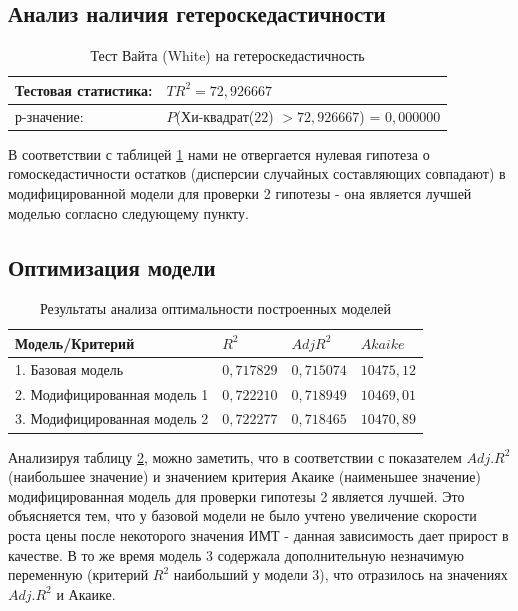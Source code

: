 \documentclass[a4paper,12pt]{article}
\begin{document}
\subsection{Анализ наличия гетероскедастичности}
\begin{table}[H]
	\begin{center}
		\begin{tabular}{ | l | l |}
			\hline
			Тестовая статистика: & $TR^2 = 72,926667$ \\ \hline
			р-значение: & $P$(Хи-квадрат($22$) $> 72,926667$) = $0,000000$ \\ \hline
		\end{tabular}
	\end{center}
	\caption{Тест Вайта (White) на гетероскедастичность}
	\label{tab:white}
\end{table}

В соответствии с таблицей \ref{tab:white} нами не отвергается нулевая гипотеза о гомоскедастичности остатков (дисперсии случайных составляющих совпадают) в модифицированной модели для проверки 2 гипотезы - она является лучшей моделью согласно следующему пункту. 

\subsection{Оптимизация модели}
\begin{table}[H]
	\begin{center}
		\begin{tabular}{ | l | l | l | l |}
			\hline
			Модель/Критерий & $R^2$ & $Adj R^2$ & $Akaike$ \\ \hline
			1. Базовая модель & $0,717829$ & $0,715074$ & $10475,12$ \\ \hline
			2. Модифицированная модель 1 & $0,722210$ & $0,718949$ & $10469,01$ \\ \hline
			3. Модифицированная модель 2 & $0,722277$ & $0,718465$ & $10470,89$ \\ \hline
		\end{tabular}
	\end{center}
	\caption{Результаты анализа оптимальности построенных моделей}
	\label{tab:optim}
\end{table}

Анализируя таблицу \ref{tab:optim}, можно заметить, что в соответствии с показателем $Adj. R^2$ (наибольшее значение) и значением критерия Акаике (наименьшее значение) модифицированная модель для проверки гипотезы 2 является лучшей. Это объясняется тем, что у базовой модели не было учтено увеличение скорости роста цены после некоторого значения ИМТ - данная зависимость дает прирост в качестве. В то же время модель 3 содержала дополнительную незначимую переменную (критерий $R^2$ наибольший у модели 3), что отразилось на значениях $Adj. R^2$ и Акаике.
\end{document}
